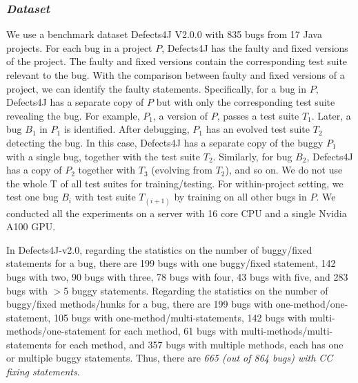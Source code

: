 \subsubsection{{\bf {\em Dataset}}}


We use a benchmark dataset Defects4J V2.0.0 \cite{defects4j} with 835
bugs from 17 Java projects. For each bug in a project $P$, Defects4J
has the faulty and fixed versions of the project. The faulty and fixed
versions contain the corresponding test suite relevant to the
bug. With the  comparison between faulty and fixed versions
of a project, we can identify the faulty statements. Specifically, for
a bug in $P$, Defects4J has a separate copy of $P$ but with only the
corresponding test suite revealing the bug. For example, $P_1$, a
version of $P$, passes a test suite $T_1$. Later, a bug $B_1$ in $P_1$
is identified. After debugging, $P_1$ has an evolved test suite $T_2$
detecting the bug. In this case, Defects4J has a separate copy of the
buggy $P_1$ with a single bug, together with the test suite
$T_2$. Similarly, for bug $B_2$, Defects4J has a copy of $P_2$
together with $T_3$ (evolving from $T_2$), and so on. We do not use
the whole T of all test suites for training/testing. For
within-project setting, we test one bug $B_i$ with test suite
$T_{(i+1)}$ by training on all other bugs in $P$. We conducted all the
experiments on a server with 16 core CPU and a single Nvidia A100 GPU.

In Defects4J-v2.0, regarding the statistics on the number of
buggy/fixed statements for a bug, there are 199 bugs with one
buggy/fixed statement, 142 bugs with two, 90 bugs with three, 78 bugs
with four, 43 bugs with five, and 283 bugs with $>$5 buggy
statements. Regarding the statistics on the number of buggy/fixed
methods/hunks for a bug,
there are 199 bugs with one-method/one-statement, 105 bugs with
one-method/multi-statements, 142 bugs with multi-methods/one-statement
for each method, 61 bugs with multi-methods/multi-statements for each
method, and 357 bugs with multiple methods, each has one or multiple
buggy statements. Thus, there are {\em 665 (out of 864 bugs) with CC
fixing statements}.





	
